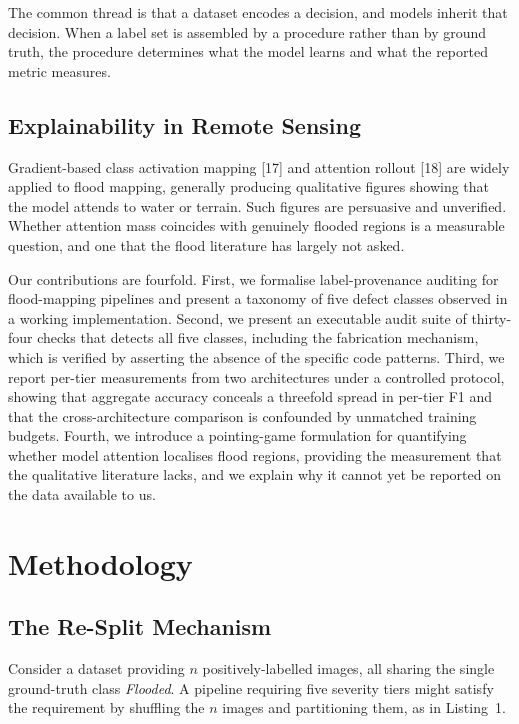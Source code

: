 \documentclass[11pt,journal]{IEEEtran}
\begin{document}
The common thread is that a dataset encodes a decision, and models inherit
that decision. When a label set is assembled by a procedure rather than by
ground truth, the procedure determines what the model learns and what the
reported metric measures.

\subsection{Explainability in Remote Sensing}

Gradient-based class activation mapping [17] and attention rollout [18] are
widely applied to flood mapping, generally producing qualitative figures
showing that the model attends to water or terrain. Such figures are
persuasive and unverified. Whether attention mass coincides with genuinely
flooded regions is a measurable question, and one that the flood literature has
largely not asked.

Our contributions are fourfold. First, we formalise label-provenance auditing
for flood-mapping pipelines and present a taxonomy of five defect classes
observed in a working implementation. Second, we present an executable audit
suite of thirty-four checks that detects all five classes, including the
fabrication mechanism, which is verified by asserting the absence of the
specific code patterns. Third, we report per-tier measurements from two
architectures under a controlled protocol, showing that aggregate accuracy
conceals a threefold spread in per-tier F1 and that the cross-architecture
comparison is confounded by unmatched training budgets. Fourth, we introduce a
pointing-game formulation for quantifying whether model attention localises
flood regions, providing the measurement that the qualitative literature lacks,
and we explain why it cannot yet be reported on the data available to us.

\section{Methodology}
\label{sec:method}

\subsection{The Re-Split Mechanism}

Consider a dataset providing $n$ positively-labelled images, all sharing the
single ground-truth class \emph{Flooded}. A pipeline requiring five severity
tiers might satisfy the requirement by shuffling the $n$ images and
partitioning them, as in Listing~1.
\end{document}
